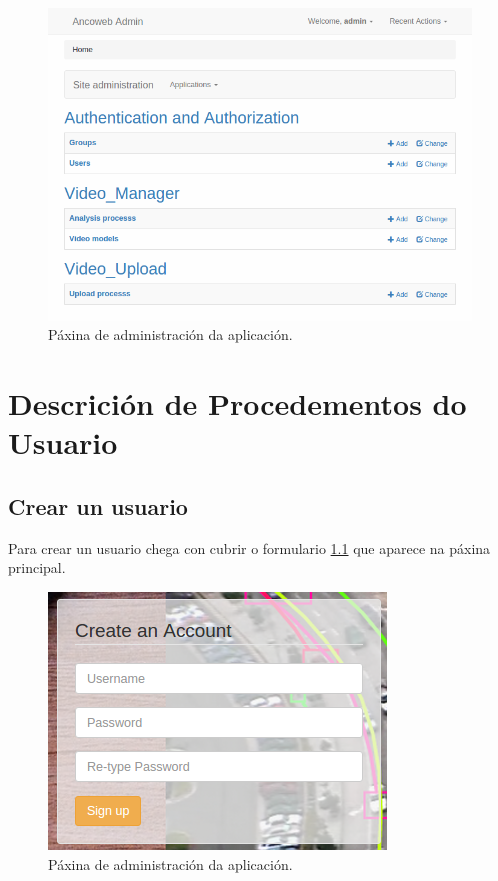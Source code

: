 \documentclass[11pt, a4paper, twoside, titlepage]{book}
\begin{document}
        \begin{figure}[htp]
        \begin{center}
            \includegraphics[scale=0.55]{figures/paxAdmin.png}
            \caption{Páxina de administración da aplicación.}
        \label{fig:paxAdmin}
        \end{center}
        \end{figure}
        
\chapter{Descrición de Procedementos do Usuario}

    \section{Crear un usuario}
    Para crear un usuario chega con cubrir o formulario \ref{fig:register} que aparece na páxina principal.
    
    \begin{figure}[htp]
    \begin{center}
        \includegraphics[scale=0.6]{figures/register.png}
        \caption{Páxina de administración da aplicación.}
    \label{fig:register}
    \end{center}
    \end{figure}
\end{document}

